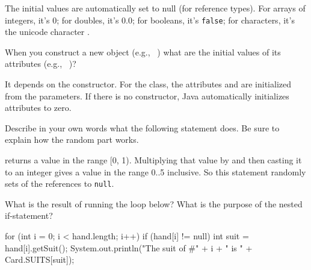 \begin{answer}
The initial values are automatically set to null (for reference types). For arrays of integers, it's 0; for doubles, it's 0.0; for booleans, it's {\tt false}; for characters, it's the unicode character .
\end{answer}


\Q When you construct a new object (e.g., ~) what are the initial values of its attributes (e.g., ~)?

\begin{answer}
It depends on the constructor. For the  class, the attributes  and  are initialized from the parameters. If there is no constructor, Java automatically initializes attributes to zero.
\end{answer}




\Q \label{random}
Describe in your own words what the following statement does. Be sure to explain how the random part works.

\begin{center}
\end{center}

\begin{answer}
 returns a value in the range [0, 1).
Multiplying that value by  and then casting it to an integer gives a value in the range 0..5 inclusive.
So this statement randomly sets of the  references to {\tt null}.
\end{answer}


\Q \label{forcard}
What is the result of running the loop below?
What is the purpose of the nested if-statement?

\begin{javalst}
for (int i = 0; i < hand.length; i++) {
    if (hand[i] != null) {
        int suit = hand[i].getSuit();
        System.out.println("The suit of #" + i + " is " + Card.SUITS[suit]);
    }
}
\end{javalst}
\vspace{-1ex}

